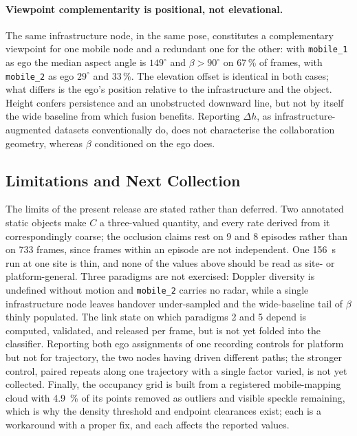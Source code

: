 \paragraph{Viewpoint complementarity is positional, not elevational.}
The same infrastructure node, in the same pose, constitutes a complementary
viewpoint for one mobile node and a redundant one for the other: with
\texttt{mobile\_1} as ego the median aspect angle is $149^\circ$ and
$\beta > 90^\circ$ on 67\,\% of frames, with \texttt{mobile\_2} as ego
$29^\circ$ and 33\,\%. The elevation offset is identical in both cases; what
differs is the ego's position relative to the infrastructure and the object.
Height confers persistence and an unobstructed downward line, but not by itself
the wide baseline from which fusion benefits. Reporting $\Delta h$, as
infrastructure-augmented datasets conventionally do, does not characterise the
collaboration geometry, whereas $\beta$ conditioned on the ego does.

\subsection{Limitations and Next Collection}
\label{sec:limitations}

The limits of the present release are stated rather than deferred. Two annotated
static objects make $C$ a three-valued quantity, and every rate derived from it
correspondingly coarse; the occlusion claims rest on 9 and 8 episodes rather
than on \num{733} frames, since frames within an episode are not independent.
One \SI{156}{\second} run at one site is thin, and none of the values above
should be read as site- or platform-general. Three paradigms are not exercised:
Doppler diversity is undefined without motion and \texttt{mobile\_2} carries no
radar, while a single infrastructure node leaves handover under-sampled and the
wide-baseline tail of $\beta$ thinly populated. The link state on which
paradigms 2 and 5 depend is computed, validated, and released per frame, but is
not yet folded into the classifier. Reporting both ego assignments of one
recording controls for platform but not for trajectory, the two nodes having
driven different paths; the stronger control, paired repeats along one
trajectory with a single factor varied, is not yet collected. Finally, the
occupancy grid is built from a registered mobile-mapping cloud with
\SI{4.9}{\percent} of its points removed as outliers and visible speckle
remaining, which is why the density threshold and endpoint clearances exist;
each is a workaround with a proper fix, and each affects the reported values.

